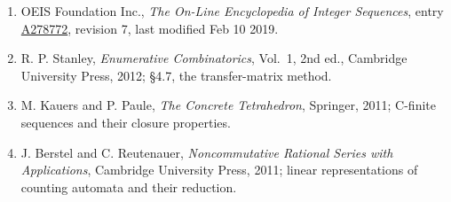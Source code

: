 \documentclass[11pt]{article}
\theoremstyle{definition}
\begin{document}
\begin{enumerate}

\item OEIS Foundation Inc., \emph{The On-Line Encyclopedia of Integer Sequences}, entry \href{https://oeis.org/A278772}{A278772}, revision 7, last modified Feb 10 2019.

\item R. P. Stanley, \emph{Enumerative Combinatorics}, Vol.~1, 2nd ed., Cambridge University Press, 2012; \S4.7, the transfer-matrix method.

\item M. Kauers and P. Paule, \emph{The Concrete Tetrahedron}, Springer, 2011; C-finite sequences and their closure properties.

\item J. Berstel and C. Reutenauer, \emph{Noncommutative Rational Series with Applications}, Cambridge University Press, 2011; linear representations of counting automata and their reduction.

\end{enumerate}
\end{document}
